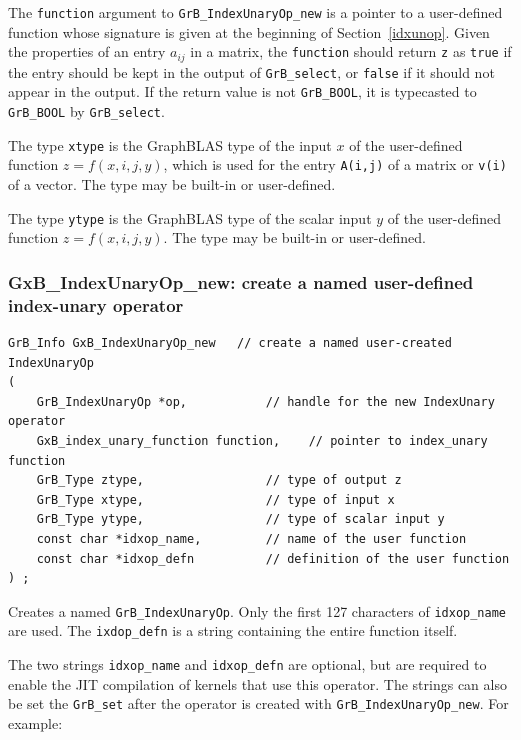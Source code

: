 The \verb'function' argument to \verb'GrB_IndexUnaryOp_new' is a pointer to a
user-defined function whose signature is given at the beginning of
Section~\ref{idxunop}.  Given the properties of an entry $a_{ij}$ in a
matrix, the \verb'function' should return \verb'z' as \verb'true' if the entry
should be kept in the output of \verb'GrB_select', or \verb'false' if it should
not appear in the output.  If the return value is not \verb'GrB_BOOL',
it is typecasted to \verb'GrB_BOOL' by \verb'GrB_select'.

The type \verb'xtype' is the GraphBLAS type of the input $x$ of the
user-defined function $z=f(x,i,j,y)$, which is used for the
entry \verb'A(i,j)' of a matrix or \verb'v(i)' of a vector.  The type may be
built-in or user-defined.

The type \verb'ytype' is the GraphBLAS type of the scalar input $y$ of the
user-defined function $z=f(x,i,j,y)$.  The type may be built-in
or user-defined.

\newpage
\subsubsection{{\sf GxB\_IndexUnaryOp\_new:} create a named user-defined index-unary operator}
\label{idxunop_new_named}

\begin{mdframed}[userdefinedwidth=6in]
{\footnotesize
\begin{verbatim}
GrB_Info GxB_IndexUnaryOp_new   // create a named user-created IndexUnaryOp
(
    GrB_IndexUnaryOp *op,           // handle for the new IndexUnary operator
    GxB_index_unary_function function,    // pointer to index_unary function
    GrB_Type ztype,                 // type of output z
    GrB_Type xtype,                 // type of input x
    GrB_Type ytype,                 // type of scalar input y
    const char *idxop_name,         // name of the user function
    const char *idxop_defn          // definition of the user function
) ;
\end{verbatim} }\end{mdframed}

Creates a named \verb'GrB_IndexUnaryOp'.  Only the first 127 characters of
\verb'idxop_name' are used.  The \verb'ixdop_defn' is a string containing the
entire function itself.

The two strings \verb'idxop_name' and \verb'idxop_defn' are optional, but are
required to enable the JIT compilation of kernels that use this operator.
The strings can also be set the \verb'GrB_set' after the operator is created
with \verb'GrB_IndexUnaryOp_new'.  For example:

